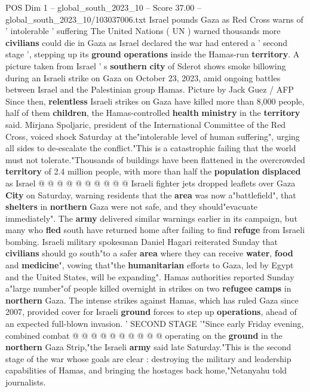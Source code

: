 \begin{textsample}{POS Dim 1 – global\_south\_2023\_10 – Score 37.00 – global\_south\_2023\_10/103037006.txt}  \label{ex:f1_pos_182}
Israel pounds Gaza as Red Cross warns of ' intolerable ' suffering The United Nations ( UN ) warned thousands more \textbf{civilians} could die in Gaza as Israel declared the war had entered a ' second stage ', stepping up its \textbf{ground} \textbf{operations} inside the Hamas-run \textbf{territory}.
A picture taken from Israel ' s \textbf{southern} \textbf{city} of Sderot shows smoke billowing during an Israeli strike on Gaza on October 23, 2023, amid ongoing battles between Israel and the Palestinian group Hamas.
Picture by Jack Guez / AFP Since then, \textbf{relentless} Israeli strikes on Gaza have killed more than 8,000 people, half of them \textbf{children}, the Hamas-controlled \textbf{health} \textbf{ministry} in the \textbf{territory} said.
Mirjana Spoljaric, president of the International Committee of the Red Cross, voiced shock Saturday at the"intolerable level of human suffering", urging all sides to de-escalate the conflict."This is a catastrophic failing that the world must not tolerate."Thousands of buildings have been flattened in the overcrowded \textbf{territory} of 2.4 million people, with more than half the \textbf{population} \textbf{displaced} as Israel @ @ @ @ @ @ @ @ @ @ Israeli fighter jets dropped leaflets over Gaza \textbf{City} on Saturday, warning residents that the \textbf{area} was now a"battlefield", that \textbf{shelters} in \textbf{northern} Gaza were not safe, and they should"evacuate immediately".
The \textbf{army} delivered similar warnings earlier in its campaign, but many who \textbf{fled} south have returned home after failing to find \textbf{refuge} from Israeli bombing.
Israeli military spokesman Daniel Hagari reiterated Sunday that \textbf{civilians} should go south"to a safer \textbf{area} where they can receive \textbf{water}, \textbf{food} and \textbf{medicine}", vowing that"the \textbf{humanitarian} efforts to Gaza, led by Egypt and the United States, will be expanding".
Hamas authorities reported Sunday a"large number"of people killed overnight in strikes on two \textbf{refugee} \textbf{camps} in \textbf{northern} Gaza.
The intense strikes against Hamas, which has ruled Gaza since 2007, provided cover for Israeli \textbf{ground} forces to step up \textbf{operations}, ahead of an expected full-blown invasion. ' SECOND STAGE '"Since early Friday evening, combined combat @ @ @ @ @ @ @ @ @ @ operating on the \textbf{ground} in the \textbf{northern} Gaza Strip,"the Israeli \textbf{army} said late Saturday."This is the second stage of the war whose goals are clear : destroying the military and leadership capabilities of Hamas, and bringing the hostages back home,"Netanyahu told journalists.

\end{textsample}
